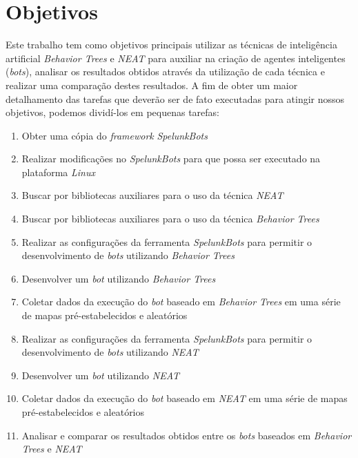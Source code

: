 \chapter{\label{chap:objectives}Objetivos}
Este trabalho tem como objetivos principais utilizar as técnicas de inteligência
artificial \textit{Behavior Trees} e \textit{NEAT} para auxiliar na criação de
agentes inteligentes (\textit{bots}), analisar os resultados obtidos através da
utilização de cada técnica e realizar uma comparação destes resultados. A fim de
obter um maior detalhamento das tarefas que deverão ser de fato executadas para
atingir nossos objetivos, podemos dividí-los em pequenas tarefas:

\begin{enumerate}
	\item
		Obter uma cópia do \textit{framework} \textit{SpelunkBots}
	\item
		Realizar modificações no \textit{SpelunkBots} para que possa ser
		executado na plataforma \textit{Linux}

	\item
		Buscar por bibliotecas auxiliares para o uso da técnica \textit{NEAT}
	\item
		Buscar por bibliotecas auxiliares para o uso da técnica \textit{Behavior
		Trees}

	\item
		Realizar as configurações da ferramenta \textit{SpelunkBots} para
		permitir o desenvolvimento de \textit{bots} utilizando \textit{Behavior
		Trees}
	\item
		Desenvolver um \textit{bot} utilizando \textit{Behavior Trees}
	\item
		Coletar dados da execução do \textit{bot} baseado em \textit{Behavior
		Trees} em uma série de mapas pré-estabelecidos e aleatórios

	\item
		Realizar as configurações da ferramenta \textit{SpelunkBots} para
		permitir o desenvolvimento de \textit{bots} utilizando \textit{NEAT}
	\item
		Desenvolver um \textit{bot} utilizando \textit{NEAT}
	\item
		Coletar dados da execução do \textit{bot} baseado em \textit{NEAT} em
		uma série de mapas pré-estabelecidos e aleatórios

	\item
		Analisar e comparar os resultados obtidos entre os \textit{bots}
		baseados em \textit{Behavior Trees} e \textit{NEAT}
\end{enumerate}
